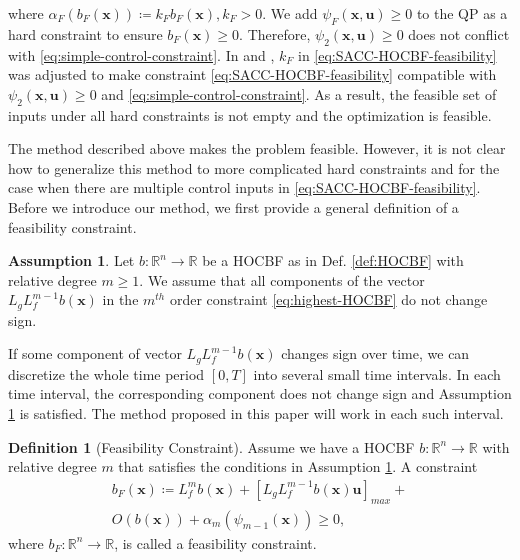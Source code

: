 \documentclass[letterpaper, 10 pt, conference]{ieeeconf}
\theoremstyle{definition}
\newtheorem{definition}{Definition}
\newtheorem{assumption}{Assumption}
\begin{document}
where $\alpha_{F}(b_{F}(\boldsymbol{x}))\coloneqq k_{F}b_{F}(\boldsymbol{x}), k_{F}>0$. We add $\psi_{F}(\boldsymbol{x},\boldsymbol{u})\ge 0$ to the QP as a hard constraint to ensure $b_{F}(\boldsymbol{x})\ge 0$. Therefore, $\psi_{2}(\boldsymbol{x},\boldsymbol{u})\ge0$ does not conflict with \eqref{eq:simple-control-constraint}. In \cite{xiao2022sufficient} and \cite{xu2022feasibility},  $k_{F}$ in \eqref{eq:SACC-HOCBF-feasibility} was adjusted to make constraint \eqref{eq:SACC-HOCBF-feasibility} compatible with $\psi_{2}(\boldsymbol{x},\boldsymbol{u})\ge0$ and \eqref{eq:simple-control-constraint}. As a result, the feasible set of inputs under all hard constraints is not empty and the optimization is feasible. 

The method described above makes the problem feasible. However, it is not clear how to generalize this method to more complicated hard constraints and for the case when there are multiple control inputs in \eqref{eq:SACC-HOCBF-feasibility}. Before we introduce our method, we first provide a general definition of a feasibility constraint. 

\begin{assumption}\label{asm:Feasibility Constraint}
Let $b:\mathbb{R}^{n}\to\mathbb{R}$ be a HOCBF as in Def. \ref{def:HOCBF} with relative degree $m\ge1$. We assume that all components of the vector $L_{g}L_{f}^{m-1}b(\boldsymbol{x})$ in the $m^{th}$ order constraint \eqref{eq:highest-HOCBF} do not change sign.
\end{assumption}

 If some component of vector $L_{g}L_{f}^{m-1}b(\boldsymbol{x})$ changes sign over time, we can discretize the whole time period $[0, T]$ into several small time intervals. In each time interval, the corresponding component does not change sign and Assumption  \ref{asm:Feasibility Constraint} is satisfied. The method proposed in this paper will work in each such interval. 


\begin{definition}[Feasibility Constraint]
\label{def:Feasibility Constraint}
Assume we have a HOCBF $b:\mathbb{R}^{n}\to\mathbb{R}$ with relative degree $m$ that satisfies the conditions in Assumption \ref{asm:Feasibility Constraint}. A constraint
\begin{equation}
\label{eq:Feasibility Constraint}
\begin{split}
b_{F}(\boldsymbol{x})\coloneqq L_{f}^{m}b(\boldsymbol{x})+[L_{g}L_{f}^{m-1}b(\boldsymbol{x})\boldsymbol{u}]_{max}+
\\O(b(\boldsymbol{x}))+
\alpha_{m}(\psi_{m-1}(\boldsymbol{x}))\ge 0,
\end{split}
\end{equation}
where $b_{F}:\mathbb{R}^{n}\to\mathbb{R}$, is called a feasibility constraint. 
\end{definition}
\end{document}

